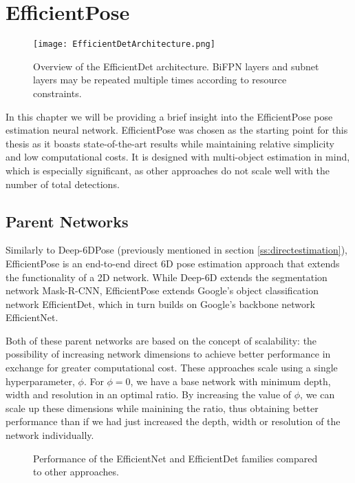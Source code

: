 \chapter{EfficientPose}

\begin{figure}[ht]
    \centering
    \texttt{[image: EfficientDetArchitecture.png]}
    \caption{Overview of the EfficientDet architecture. BiFPN layers and subnet layers may be repeated multiple times according to resource constraints.}
    \label{effdet}
\end{figure}

In this chapter we will be providing a brief insight into the EfficientPose pose estimation neural network. EfficientPose was chosen as the starting point for this thesis as it boasts state-of-the-art results while maintaining relative simplicity and low computational costs. It is designed with multi-object estimation in mind, which is especially significant, as other approaches do not scale well with the number of total detections.

\section{Parent Networks}

Similarly to Deep-6DPose (previously mentioned in section \ref*{ss:directestimation}), EfficientPose is an end-to-end direct 6D pose estimation approach that extends the functionality of a 2D network. While Deep-6D extends the segmentation network Mask-R-CNN, EfficientPose extends Google's object classification network EfficientDet\cite{EfficientDet}, which in turn builds on Google's backbone network EfficientNet\cite{EfficientNet}.

Both of these parent networks are based on the concept of scalability: the possibility of increasing network dimensions to achieve better performance in exchange for greater computational cost. These approaches scale using a single hyperparameter, $\phi$. For $\phi = 0$, we have a base network with minimum depth, width and resolution in an optimal ratio. By increasing the value of $\phi$, we can scale up these dimensions while mainining the ratio, thus obtaining better performance than if we had just increased the depth, width or resolution of the network individually.

\begin{figure}[htp]
    

    \caption{Performance of the EfficientNet and EfficientDet families compared to other approaches.}
\end{figure}

